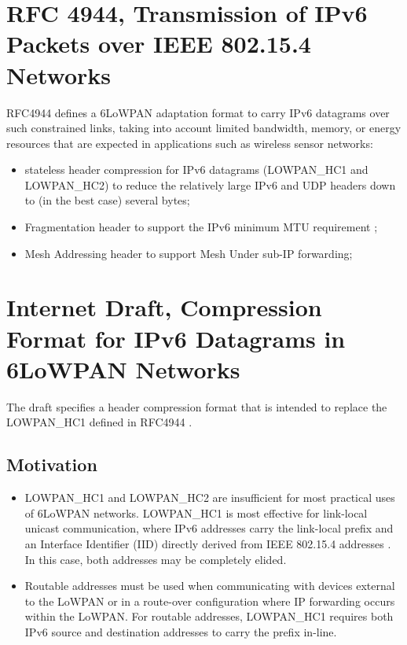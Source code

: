 \documentclass[a4paper,11pt,oneside]{article}
\begin{document}
 
\section{RFC 4944, Transmission of IPv6 Packets over IEEE 802.15.4 Networks}
RFC4944 \cite{rfc4944} defines a 6LoWPAN adaptation format to carry IPv6 datagrams over such constrained links, taking into account limited
bandwidth, memory, or energy resources that are expected in applications such as wireless sensor networks:
\begin{itemize}
\item stateless header compression for IPv6 datagrams (LOWPAN\_HC1 and LOWPAN\_HC2) to reduce the relatively large IPv6 and UDP headers down to (in the best case) several bytes;
\item Fragmentation header to support the IPv6 minimum MTU requirement \cite{rfc2460};
\item Mesh Addressing header to support Mesh Under sub-IP forwarding;
\end{itemize}

\section{ Internet Draft, Compression Format for IPv6 Datagrams in 6LoWPAN Networks} 
The draft \cite{draft-hc-06} specifies a header compression format that is intended
   to replace the LOWPAN\_HC1 defined in RFC4944 \cite{rfc4944}.

\subsection{Motivation}
\begin{itemize}
\item LOWPAN\_HC1 and LOWPAN\_HC2 are insufficient for most practical uses of 6LoWPAN networks.  LOWPAN\_HC1 is most effective for link-local unicast communication, where IPv6 addresses carry the link-local prefix and an Interface Identifier (IID) directly derived from IEEE 802.15.4 addresses \cite{rfc4291}.  In this case, both addresses may be completely elided. 

\item Routable addresses must be used when communicating with devices
external to the LoWPAN or in a route-over configuration where IP
forwarding occurs within the LoWPAN.  For routable addresses,
LOWPAN\_HC1 requires both IPv6 source and destination addresses to
carry the prefix in-line. 
\end{itemize}
\end{document}
